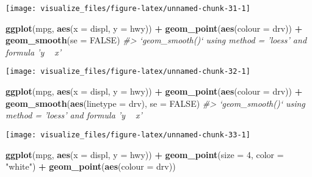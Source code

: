 \documentclass[]{book}
\newenvironment{Shaded}{\begin{snugshade}}{\end{snugshade}}
\newcommand{\CommentTok}[1]{\textcolor[rgb]{0.56,0.35,0.01}{\textit{#1}}}
\newcommand{\DataTypeTok}[1]{\textcolor[rgb]{0.13,0.29,0.53}{#1}}
\newcommand{\DecValTok}[1]{\textcolor[rgb]{0.00,0.00,0.81}{#1}}
\newcommand{\KeywordTok}[1]{\textcolor[rgb]{0.13,0.29,0.53}{\textbf{#1}}}
\newcommand{\NormalTok}[1]{#1}
\newcommand{\OperatorTok}[1]{\textcolor[rgb]{0.81,0.36,0.00}{\textbf{#1}}}
\newcommand{\OtherTok}[1]{\textcolor[rgb]{0.56,0.35,0.01}{#1}}
\newcommand{\StringTok}[1]{\textcolor[rgb]{0.31,0.60,0.02}{#1}}
\theoremstyle{plain}
\theoremstyle{remark}
\theoremstyle{definition}
\theoremstyle{definition}
\theoremstyle{definition}
\theoremstyle{remark}
\begin{document}
\begin{center}\texttt{[image: visualize\_files/figure-latex/unnamed-chunk-31-1]} \end{center}

\begin{Shaded}
\begin{Highlighting}[]
\KeywordTok{ggplot}\NormalTok{(mpg, }\KeywordTok{aes}\NormalTok{(}\DataTypeTok{x =}\NormalTok{ displ, }\DataTypeTok{y =}\NormalTok{ hwy)) }\OperatorTok{+}
\StringTok{  }\KeywordTok{geom_point}\NormalTok{(}\KeywordTok{aes}\NormalTok{(}\DataTypeTok{colour =}\NormalTok{ drv)) }\OperatorTok{+}
\StringTok{  }\KeywordTok{geom_smooth}\NormalTok{(}\DataTypeTok{se =} \OtherTok{FALSE}\NormalTok{)}
\CommentTok{#> `geom_smooth()` using method = 'loess' and formula 'y ~ x'}
\end{Highlighting}
\end{Shaded}

\begin{center}\texttt{[image: visualize\_files/figure-latex/unnamed-chunk-32-1]} \end{center}

\begin{Shaded}
\begin{Highlighting}[]
\KeywordTok{ggplot}\NormalTok{(mpg, }\KeywordTok{aes}\NormalTok{(}\DataTypeTok{x =}\NormalTok{ displ, }\DataTypeTok{y =}\NormalTok{ hwy)) }\OperatorTok{+}
\StringTok{  }\KeywordTok{geom_point}\NormalTok{(}\KeywordTok{aes}\NormalTok{(}\DataTypeTok{colour =}\NormalTok{ drv)) }\OperatorTok{+}
\StringTok{  }\KeywordTok{geom_smooth}\NormalTok{(}\KeywordTok{aes}\NormalTok{(}\DataTypeTok{linetype =}\NormalTok{ drv), }\DataTypeTok{se =} \OtherTok{FALSE}\NormalTok{)}
\CommentTok{#> `geom_smooth()` using method = 'loess' and formula 'y ~ x'}
\end{Highlighting}
\end{Shaded}

\begin{center}\texttt{[image: visualize\_files/figure-latex/unnamed-chunk-33-1]} \end{center}

\begin{Shaded}
\begin{Highlighting}[]
\KeywordTok{ggplot}\NormalTok{(mpg, }\KeywordTok{aes}\NormalTok{(}\DataTypeTok{x =}\NormalTok{ displ, }\DataTypeTok{y =}\NormalTok{ hwy)) }\OperatorTok{+}
\StringTok{   }\KeywordTok{geom_point}\NormalTok{(}\DataTypeTok{size =} \DecValTok{4}\NormalTok{, }\DataTypeTok{color =} \StringTok{"white"}\NormalTok{) }\OperatorTok{+}
\StringTok{   }\KeywordTok{geom_point}\NormalTok{(}\KeywordTok{aes}\NormalTok{(}\DataTypeTok{colour =}\NormalTok{ drv))}
\end{Highlighting}
\end{Shaded}
\end{document}
